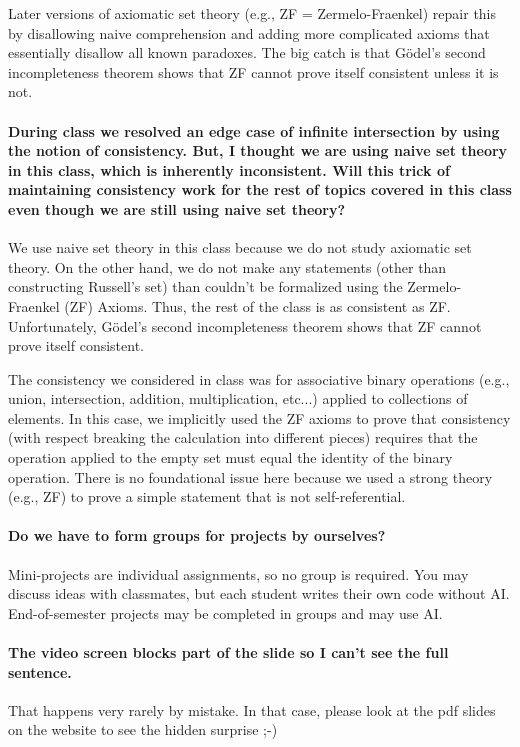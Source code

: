 \documentclass[10pt,english]{article}
\begin{document}
Later versions of axiomatic set theory (e.g., ZF = Zermelo-Fraenkel) repair this by disallowing naive comprehension and adding more complicated axioms that essentially disallow all known paradoxes.
The big catch is that G\"{o}del's second incompleteness theorem shows that ZF cannot prove itself consistent unless it is not.

\paragraph{During class we resolved an edge case of infinite intersection by using the notion of consistency.  But, I thought we are using naive set theory in this class, which is inherently inconsistent. Will this trick of maintaining consistency work for the rest of topics covered in this class even though we are still using naive set theory?}

We use naive set theory in this class because we do not study axiomatic set theory.
On the other hand, we do not make any statements (other than constructing Russell's set) than couldn't be formalized using the Zermelo-Fraenkel (ZF) Axioms.
Thus, the rest of the class is as consistent as ZF.
Unfortunately, G\"{o}del's second incompleteness theorem shows that ZF cannot prove itself consistent.

The consistency we considered in class was for associative binary operations (e.g., union, intersection, addition, multiplication, etc...) applied to collections of elements.
In this case, we implicitly used the ZF axioms to prove that consistency (with respect breaking the calculation into different pieces) requires that the operation applied to the empty set must equal the identity of the binary operation.
There is no foundational issue here because we used a strong theory (e.g., ZF) to prove a simple statement that is not self-referential.


\paragraph{Do we have to form groups for projects by ourselves?}


Mini-projects are individual assignments, so no group is required.
You may discuss ideas with classmates, but each student writes their own code without AI.
End-of-semester projects may be completed in groups and may use AI.


\paragraph{The video screen blocks part of the slide so I can't see the full sentence.}

That happens very rarely by mistake.  In that case, please look at the pdf slides on the website to see the hidden surprise ;-)
\end{document}
